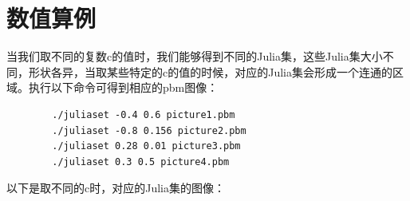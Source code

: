 \documentclass[UTF8,a4paper]{ctexart}
\begin{document}
	\section{数值算例}
	当我们取不同的复数c的值时，我们能够得到不同的Julia集，这些Julia集大小不同，形状各异，当取某些特定的c的值的时候，对应的Julia集会形成一个连通的区域。执行以下命令可得到相应的pbm图像：
	\begin{verbatim}
		./juliaset -0.4 0.6 picture1.pbm
		./juliaset -0.8 0.156 picture2.pbm
		./juliaset 0.28 0.01 picture3.pbm
		./juliaset 0.3 0.5 picture4.pbm
	\end{verbatim}
	以下是取不同的c时，对应的Julia集的图像：
	\begin{figure}[ht]
		\centering
	\end{figure}
	\begin{figure}[ht]
		\centering
	\end{figure}
	\newpage
\end{document}
